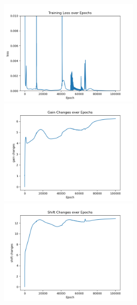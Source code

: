 \documentclass[12pt, a4paper]{article}
\begin{document}
\begin{figure}[H]
    \centering
    \includegraphics[width=0.6\textwidth]{analysis/fig/0221_SIN2_bphcppt_loss.png} \\
    \includegraphics[width=0.6\textwidth]{analysis/fig/0221_SIN2_bphcppt_gc.png} \\
    \includegraphics[width=0.6\textwidth]{analysis/fig/0221_SIN2_bphcppt_sc.png} \\
\end{figure}
\end{document}
